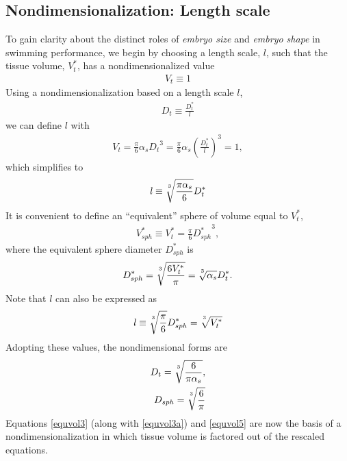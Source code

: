 \documentclass[10pt,a4paper]{article}
\def\non{\nonumber}
\def\l{\mathit{l}}
\def\Dts{D_t^*}
\def\Dt{D_t}
\def\Dss{D_{sph}^*}
\def\Ds{D_{sph}}
\def\Vts{V_t^*}
\def\Vt{V_t}
\def\Vss{V_{sph}^*}
\begin{document}

\subsection{Nondimensionalization: Length scale}
To gain clarity about the distinct roles of \textit{embryo size} and \textit{embryo shape} in swimming performance, we begin by choosing a length scale, $\l$, such that the tissue volume, $\Vts$, has a nondimensionalized value 
\begin{eqnarray}\label{equvol0}
	\Vt \equiv 1
\end{eqnarray} 
Using a nondimensionalization based on a length scale $\l$,
\begin{eqnarray}\label{equvol1}
	\Dt \equiv \frac{\Dts}{\l}
\end{eqnarray} 
we can define $\l$ with 
\begin{eqnarray}\label{equvol2}
	\Vt = \frac{\pi}{6} \alpha_s {\Dt}^3 = \frac{\pi}{6} \alpha_s \left(\frac{\Dts}{\l}\right)^3 = 1,
\end{eqnarray} 
which simplifies to
\begin{eqnarray}\label{equvol3}
	\l \equiv \sqrt[\uproot{5}3]{\frac{\pi \alpha_s}{6}} \Dts
\end{eqnarray} 
It is convenient to define an ``equivalent'' sphere of volume equal to $V_t^*$,
\begin{eqnarray}\label{equivsphere}
	\Vss \equiv \Vts = \frac{\pi}{6} {\Dss}^3,
\end{eqnarray} 
where the equivalent sphere diameter $\Dss$ is
\begin{eqnarray}\label{equvol4}
	\Dss = \sqrt[\uproot{5}3]{\frac{6 \Vts}{\pi}} = \sqrt[\uproot{5}3]{\alpha_s} \Dts .
\end{eqnarray} 
Note that $\l$ can also be expressed as
\begin{eqnarray}\label{equvol3a}
	\l \equiv \sqrt[\uproot{5}3]{\frac{\pi}{6}} \Dss = \sqrt[\uproot{5}3]{\Vts}
\end{eqnarray} 
Adopting these values, the nondimensional forms are
\begin{eqnarray}\label{equvol5}
	\Dt = \sqrt[\uproot{5}3]{\frac{6}{\pi \alpha_s}} \non, \\
	\Ds = \sqrt[\uproot{5}3]{\frac{6}{\pi}}
\end{eqnarray}
Equations \ref{equvol3} (along with \ref{equvol3a}) and \ref{equvol5} are now the basis of a nondimensionalization in which tissue volume is factored out of the rescaled equations.
\end{document}
